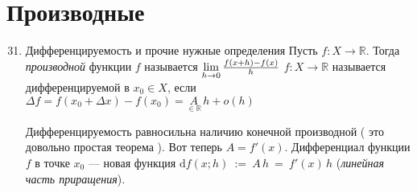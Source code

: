 \documentclass[a4paper,12pt]{article}
\newcommand\R{\mathbb{R}}
\newcommand\ilim{\lim\limits}
\theoremstyle{plain}
\theoremstyle{definition}
\theoremstyle{remark}
\def\resetdefs{ \setcounter{defn}{0}\setcounter{exmp}{0} }
\def\resetthrm{ \setcounter{thrm}{0}\setcounter{stat}{0} }
\def\resetrem{ \setcounter{rem}{0} }
\def\resetall{ \resetdefs \resetthrm \resetrem}
\begin{document}
\section*{Производные}
\begin{enumerate} 
\setcounter{enumi}{30}
  \item Дифференцируемость и прочие нужные определения
    \resetall
    {  Пусть $f : X \to \R$. Тогда \emph{производной} функции $f$ называется 
    $\ilim_{h\to 0}{f(x+h) - f(x) \over h}$ \label{def:derivative}}
    {  $f : X \to \R$ называется дифференцируемой в $x_0 \in X$, если 
    $\Delta f = f(x_0 + \Delta x) - f(x_0) = \underset{\in \R }{A}\,h + o(h)$  }
  
    Дифференцируемость равносильна наличию конечной производной ( это довольно простая теорема ).
    Вот теперь $A = f'(x)$.
    {  Дифференциал функции $f$ в точке $x_0 $ --- новая функция 
      $\mathrm{d}f(x;h)$~:=~$A\,h$~=~$f'(x)\,h$ (\textit{линейная часть приращения}).}
  

\end{enumerate}
\end{document}
